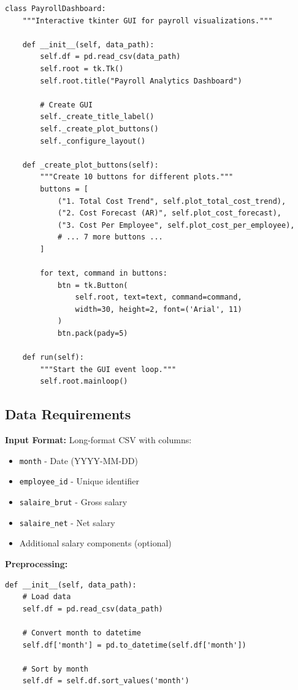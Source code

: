 \begin{lstlisting}[style=pythonstyle]
class PayrollDashboard:
    """Interactive tkinter GUI for payroll visualizations."""
    
    def __init__(self, data_path):
        self.df = pd.read_csv(data_path)
        self.root = tk.Tk()
        self.root.title("Payroll Analytics Dashboard")
        
        # Create GUI
        self._create_title_label()
        self._create_plot_buttons()
        self._configure_layout()
    
    def _create_plot_buttons(self):
        """Create 10 buttons for different plots."""
        buttons = [
            ("1. Total Cost Trend", self.plot_total_cost_trend),
            ("2. Cost Forecast (AR)", self.plot_cost_forecast),
            ("3. Cost Per Employee", self.plot_cost_per_employee),
            # ... 7 more buttons ...
        ]
        
        for text, command in buttons:
            btn = tk.Button(
                self.root, text=text, command=command,
                width=30, height=2, font=('Arial', 11)
            )
            btn.pack(pady=5)
    
    def run(self):
        """Start the GUI event loop."""
        self.root.mainloop()
\end{lstlisting}

\subsection{Data Requirements}

\textbf{Input Format:} Long-format CSV with columns:
\begin{itemize}
    \item \texttt{month} - Date (YYYY-MM-DD)
    \item \texttt{employee\_id} - Unique identifier
    \item \texttt{salaire\_brut} - Gross salary
    \item \texttt{salaire\_net} - Net salary
    \item Additional salary components (optional)
\end{itemize}

\textbf{Preprocessing:}
\begin{lstlisting}[style=pythonstyle]
def __init__(self, data_path):
    # Load data
    self.df = pd.read_csv(data_path)
    
    # Convert month to datetime
    self.df['month'] = pd.to_datetime(self.df['month'])
    
    # Sort by month
    self.df = self.df.sort_values('month')
\end{lstlisting}

